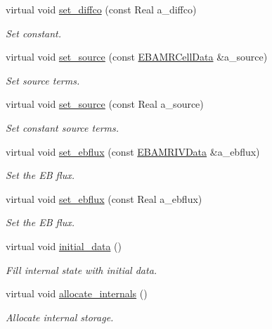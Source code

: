 \begin{DoxyCompactItemize}
virtual void \hyperlink{classcdr__solver_a9f3be3b605b730465894f3ac02f1cf16}{set\+\_\+diffco} (const Real a\+\_\+diffco)
\begin{DoxyCompactList}\small\item\em Set constant. \end{DoxyCompactList}\item 
virtual void \hyperlink{classcdr__solver_a7e4ec0eb3feb6659cb3d72ddded1a953}{set\+\_\+source} (const \hyperlink{type__definitions_8H_a7e610f301989e5e07781c5e338bdb7c3}{E\+B\+A\+M\+R\+Cell\+Data} \&a\+\_\+source)
\begin{DoxyCompactList}\small\item\em Set source terms. \end{DoxyCompactList}\item 
virtual void \hyperlink{classcdr__solver_a3e66d60d60b2ba7c7eb01000a4a36bad}{set\+\_\+source} (const Real a\+\_\+source)
\begin{DoxyCompactList}\small\item\em Set constant source terms. \end{DoxyCompactList}\item 
virtual void \hyperlink{classcdr__solver_a0b8cd5ac5619bd6021a7dac17966b180}{set\+\_\+ebflux} (const \hyperlink{type__definitions_8H_a6b8fa905d55cbb491b52180386f0e0c1}{E\+B\+A\+M\+R\+I\+V\+Data} \&a\+\_\+ebflux)
\begin{DoxyCompactList}\small\item\em Set the EB flux. \end{DoxyCompactList}\item 
virtual void \hyperlink{classcdr__solver_a2f30c778bd113999db7217a2b901bd84}{set\+\_\+ebflux} (const Real a\+\_\+ebflux)
\begin{DoxyCompactList}\small\item\em Set the EB flux. \end{DoxyCompactList}\item 
virtual void \hyperlink{classcdr__solver_afa7e2d268768dda52ca9a9cb723f5a2e}{initial\+\_\+data} ()
\begin{DoxyCompactList}\small\item\em Fill internal state with initial data. \end{DoxyCompactList}\item 
virtual void \hyperlink{classcdr__solver_a78ff9e23097281fa3bc425868d6ef87f}{allocate\+\_\+internals} ()
\begin{DoxyCompactList}\small\item\em Allocate internal storage. \end{DoxyCompactList}\item 

\end{DoxyCompactItemize}
